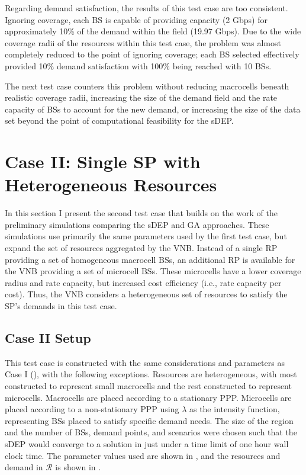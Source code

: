 \documentclass[12pt,dvipsnames]{report}
\begin{document}
Regarding demand satisfaction, the results of this test case are too consistent.  Ignoring coverage, each BS is capable of providing capacity (2 Gbps) for approximately 10\% of the demand within the field (19.97 Gbps).  Due to the wide coverage radii of the resources within this test case, the problem was almost completely reduced to the point of ignoring coverage; each BS selected effectively provided 10\% demand satisfaction with 100\% being reached with 10 BSs.

The next test case counters this problem without reducing macrocells beneath realistic coverage radii, increasing the size of the demand field and the rate capacity of BSs to account for the new demand, or increasing the size of the data set beyond the point of computational feasibility for the sDEP.

\section{Case II: Single SP with Heterogeneous Resources} \label{sec:caseII}

In this section I present the second test case that builds on the work of the preliminary simulations comparing the sDEP and GA approaches.  These simulations use primarily the same parameters used by the first test case, but expand the set of resources aggregated by the VNB.  Instead of a single RP providing a set of homogeneous macrocell BSs, an additional RP is available for the VNB providing a set of microcell BSs.  These microcells have a lower coverage radius and rate capacity, but increased cost efficiency (i.e., rate capacity per cost).  Thus, the VNB considers a heterogeneous set of resources to satisfy the SP's demands in this test case.

\subsection{Case II Setup} \label{subsec:caseII_setup}

This test case is constructed with the same considerations and parameters as Case I (), with the following exceptions.  Resources are heterogeneous, with most constructed to represent small macrocells and the rest constructed to represent microcells.  Macrocells are placed according to a stationary PPP.  Microcells are placed according to a non-stationary PPP using $\lambda$ as the intensity function, representing BSs placed to satisfy specific demand needs.  The size of the region and the number of BSs, demand points, and scenarios were chosen such that the sDEP would converge to a solution in just under a time limit of one hour wall clock time.  The parameter values used are shown in , and the resources and demand in $\mathcal{R}$ is shown in .
\end{document}
